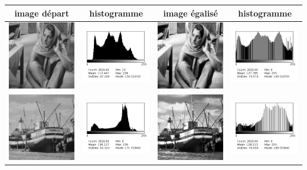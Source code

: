 \documentclass[a4paper,11pt]{article}
\begin{document}
  \begin{tabular}{|c|c|c|c|}
   \hline
   image départ & histogramme & image égalisé & histogramme\\
   \hline
   \includegraphics[width=3cm]{barb.png} & \includegraphics[width=3cm]{../histo/image/hist_barb.png} & \includegraphics[width=3cm]{../res/barbQ3.png} & \includegraphics[width=3cm]{../histo/resultat/barbQ3.png}\\
   \hline
   \includegraphics[width=3cm]{boat.png} & \includegraphics[width=3cm]{../histo/image/hist_boat.png} & \includegraphics[width=3cm]{../res/boatQ3.png} & \includegraphics[width=3cm]{../histo/resultat/boatQ3.png}\\

\end{tabular}
\end{document}
